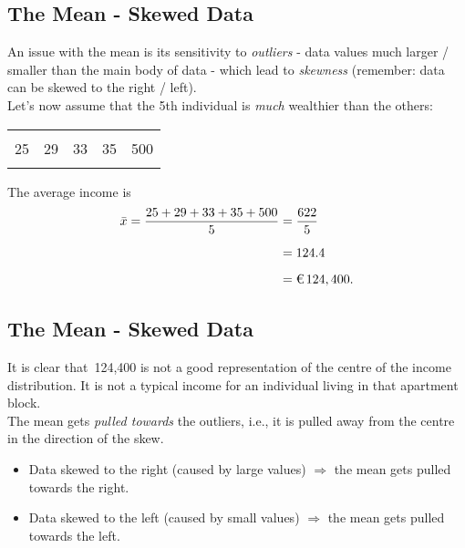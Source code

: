 \subsection{The Mean - Skewed Data}
\begin{frame}{\bf {}}
An issue with the mean is its sensitivity to \emph{outliers} - data values much larger / smaller than the main body of data - which lead to \emph{skewness} (remember: data can be skewed to the right / left).\\[0.4cm]
Let's now assume that the 5th individual is \emph{much} wealthier than the others:
\begin{center}
\begin{tabular}{|ccccc|}
\hline
&&&&\\[-0.4cm]
25 & 29 & 33 & 35 & 500 \\
\hline
\multicolumn{5}{c}{}\\
\end{tabular}
\end{center}
The average income is
\begin{align*}
\bar x = \frac{25 + 29 + 33 + 35 + 500}{5} &= \frac{622}{5} \\[0.2cm]
&= 124.4 \\[0.2cm]
&= \text{\texteuro\,} 124,400.
\end{align*}


\end{frame}


\subsection{The Mean - Skewed Data}
\begin{frame}{\bf {}}

It is clear that \texteuro\,124,400 is not a good representation of the centre of the income distribution. It is not a typical income for an individual living in that apartment block.\\[0.6cm]

The mean gets \emph{pulled towards} the outliers, i.e., it is pulled away from the centre in the direction of the skew.\\[0.3cm]
\begin{itemize}\itemsep0.5cm
\item Data skewed to the right (caused by large values) \newline\phantom{\quad}$\Rightarrow$ the mean gets pulled towards the right.\\[0.4cm]
\item Data skewed to the left (caused by small values) \newline\phantom{\quad}$\Rightarrow$ the mean gets pulled towards the left.
\end{itemize}

\end{frame}




